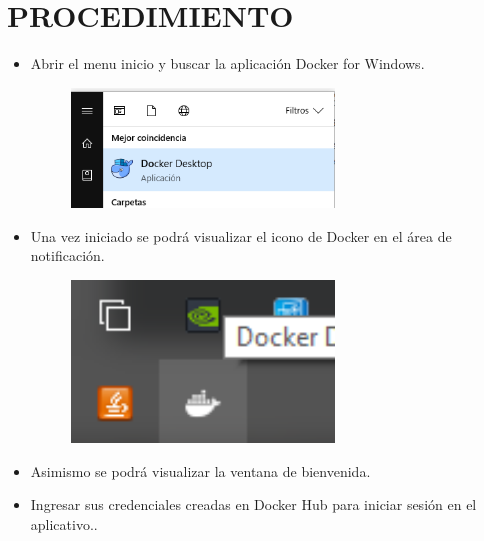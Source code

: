 \section{PROCEDIMIENTO} 

\begin{itemize}
\subsection{Parte 1: Iniciando Docker:}
	\item Abrir el menu inicio y buscar la aplicación Docker for Windows.
                    \begin{figure}[H]
		\begin{center}
		\includegraphics[width=7cm]{./Imagenes/25}
		\end{center}
		\end{figure}
	\item Una vez iniciado se podrá visualizar el icono de Docker en el área de notificación.
   \begin{figure}[H]
		\begin{center}
		\includegraphics[width=7cm]{./Imagenes/26}
		\end{center}
		\end{figure}
          \item Asimismo se podrá visualizar la ventana de bienvenida.
          \item Ingresar sus credenciales creadas en Docker Hub para iniciar sesión en el aplicativo..
   \begin{figure}[H]
		\begin{center}

\end{center}
\end{figure}
\end{itemize}
